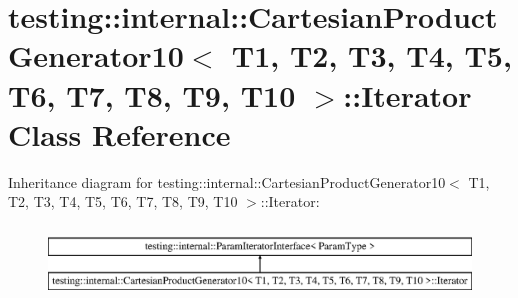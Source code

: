 \hypertarget{classtesting_1_1internal_1_1_cartesian_product_generator10_1_1_iterator}{}\section{testing\+:\+:internal\+:\+:Cartesian\+Product\+Generator10$<$ T1, T2, T3, T4, T5, T6, T7, T8, T9, T10 $>$\+:\+:Iterator Class Reference}
\label{classtesting_1_1internal_1_1_cartesian_product_generator10_1_1_iterator}
Inheritance diagram for testing\+:\+:internal\+:\+:Cartesian\+Product\+Generator10$<$ T1, T2, T3, T4, T5, T6, T7, T8, T9, T10 $>$\+:\+:Iterator\+:\begin{figure}[H]
\begin{center}
\leavevmode
\includegraphics[height=1.941074cm]{classtesting_1_1internal_1_1_cartesian_product_generator10_1_1_iterator}
\end{center}
\end{figure}
